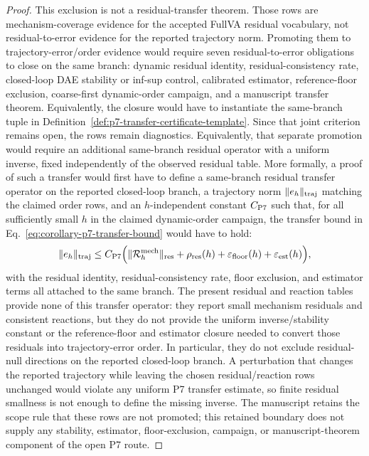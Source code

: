 \documentclass[preprint,12pt]{elsarticle}
\begin{document}
\begin{proof}
This exclusion is not a residual-transfer theorem.
Those rows are mechanism-coverage evidence for the accepted FullVA residual
vocabulary, not residual-to-error evidence for the reported trajectory norm.
Promoting them to trajectory-error/order evidence would require seven
residual-to-error obligations to close on the same branch: dynamic residual
identity, residual-consistency rate, closed-loop DAE stability or inf-sup
control, calibrated estimator, reference-floor exclusion, coarse-first
dynamic-order campaign, and a manuscript transfer theorem. Equivalently, the
closure would have to instantiate the same-branch tuple in
Definition~\ref{def:p7-transfer-certificate-template}. Since that joint
criterion remains open, the rows remain diagnostics.
Equivalently, that separate promotion would require an additional same-branch
residual operator with a uniform inverse, fixed independently of the observed
residual table.
More formally, a proof of such a transfer would first have to define a same-branch residual
transfer operator on the reported closed-loop branch, a trajectory norm
\(\|e_h\|_{\rm traj}\) matching the claimed order rows, and an
\(h\)-independent constant \(C_{\rm P7}\) such that, for all sufficiently
small \(h\) in the claimed dynamic-order campaign, the transfer bound in
Eq.~\eqref{eq:corollary-p7-transfer-bound} would have to hold:
\begin{equation}
\label{eq:corollary-p7-transfer-bound}
  \|e_h\|_{\rm traj}
  \le C_{\rm P7}\Bigl(
     \|\mathcal R_h^{\rm mech}\|_{\rm res}
     +\rho_{\rm res}(h)
     +\varepsilon_{\rm floor}(h)
     +\varepsilon_{\rm est}(h)
  \Bigr),
\end{equation}
with the residual identity, residual-consistency rate, floor exclusion, and
estimator terms all attached to the same branch. The present residual and
reaction tables provide none of this transfer operator: they report small
mechanism residuals and consistent reactions, but they do not provide the
uniform inverse/stability constant or the reference-floor and estimator
closure needed to convert those residuals into trajectory-error order.
In particular, they do not exclude residual-null directions on the reported
closed-loop branch.  A perturbation that changes the reported trajectory
while leaving the chosen residual/reaction rows unchanged would violate any
uniform P7 transfer estimate, so finite residual smallness is not enough to
define the missing inverse.
The manuscript retains the scope rule that these rows are not promoted;
this retained boundary does not supply any stability, estimator,
floor-exclusion, campaign, or manuscript-theorem component of the open P7
route.
\end{proof}
\end{document}
